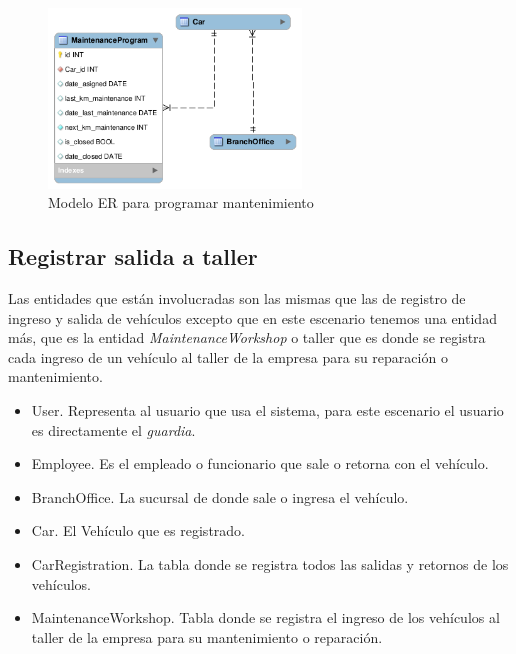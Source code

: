 \begin{figure}[h]
  \begin{center}
    \includegraphics[width=0.6\textwidth]{figures/chapter4/er_prog_mant.png}
    \caption[Modelo ER - Programar mantenimiento]{Modelo ER para programar mantenimiento}
  \end{center}
\end{figure}

\subsection{Registrar salida a taller}
Las entidades que están involucradas son las mismas que las de registro de ingreso
y salida de vehículos excepto que en este escenario tenemos una entidad más, que
es la entidad {\it MaintenanceWorkshop} o taller que es donde se registra cada
ingreso de un vehículo al taller de la empresa para su reparación o mantenimiento.

\begin{itemize}
    \item User. Representa al usuario que usa el sistema, para este escenario el
      usuario es directamente el {\it guardia}.
    \item Employee. Es el empleado o funcionario que sale o retorna con el vehículo.
    \item BranchOffice. La sucursal de donde sale o ingresa el vehículo.
    \item Car. El Vehículo que es registrado.
    \item CarRegistration. La tabla donde se registra todos las salidas y retornos
        de los vehículos.
    \item MaintenanceWorkshop. Tabla donde se registra el ingreso de los vehículos al
      taller de la empresa para su mantenimiento o reparación.
\end{itemize}

